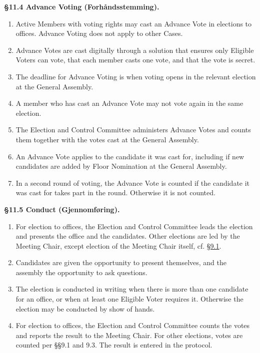 \documentclass{../../../Common/Latex/Templates/rapport}
\begin{document}
\textbf{\S 11.4 Advance Voting (Forhåndsstemming).}\label{bylaw:11.4}
\begin{enumerate}
  \item Active Members with voting rights may cast an Advance Vote in elections to offices. Advance Voting does not apply to other Cases.
  \item Advance Votes are cast digitally through a solution that ensures only Eligible Voters can vote, that each member casts one vote, and that the vote is secret.
  \item The deadline for Advance Voting is when voting opens in the relevant election at the General Assembly.
  \item A member who has cast an Advance Vote may not vote again in the same election.
  \item The Election and Control Committee administers Advance Votes and counts them together with the votes cast at the General Assembly.
  \item An Advance Vote applies to the candidate it was cast for, including if new candidates are added by Floor Nomination at the General Assembly.
  \item In a second round of voting, the Advance Vote is counted if the candidate it was cast for takes part in the round. Otherwise it is not counted.
\end{enumerate}

\textbf{\S 11.5 Conduct (Gjennomføring).}\label{bylaw:11.5}
\begin{enumerate}
  \item For election to offices, the Election and Control Committee leads the election and presents the office and the candidates. Other elections are led by the Meeting Chair, except election of the Meeting Chair itself, cf. \hyperref[bylaw:9.1]{\S 9.1}.
  \item Candidates are given the opportunity to present themselves, and the assembly the opportunity to ask questions.
  \item The election is conducted in writing when there is more than one candidate for an office, or when at least one Eligible Voter requires it. Otherwise the election may be conducted by show of hands.
  \item For election to offices, the Election and Control Committee counts the votes and reports the result to the Meeting Chair. For other elections, votes are counted per \S\S9.1 and 9.3. The result is entered in the protocol.
\end{enumerate}
\end{document}
